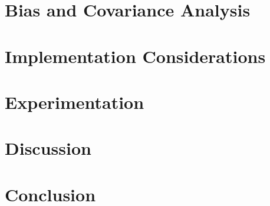 \section{Bias and Covariance Analysis}
\label{s,perk,perf}

\section{Implementation Considerations}
\label{s,perk,pract}

\section{Experimentation}
\label{s,perk,exp}

\section{Discussion}
\label{s,perk,disc}

\section{Conclusion}
\label{s,perk,conc}
